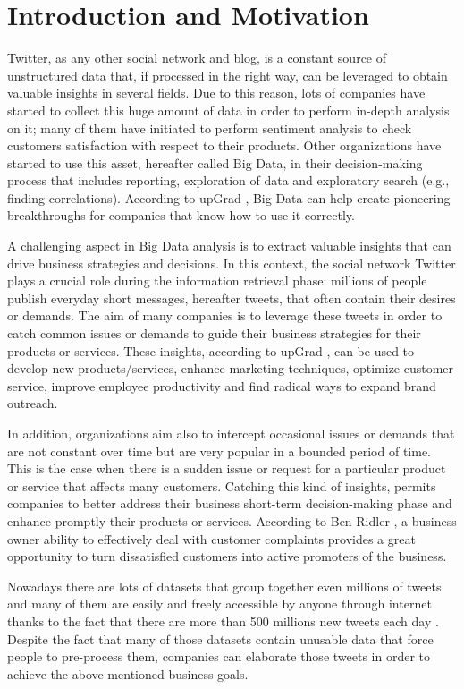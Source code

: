 \section{Introduction and Motivation}
\label{sec:introduction}
Twitter, as any other social network and blog, is a constant source of unstructured data that, if processed in the right way, can be leveraged to obtain valuable insights in several fields. Due to this reason, lots of companies have started to collect this huge amount of data in order to perform in-depth analysis on it; many of them have initiated to perform sentiment analysis to check customers satisfaction with respect to their products. Other organizations have started to use this asset, hereafter called Big Data, in their decision-making process that includes reporting, exploration of data and exploratory search (e.g., finding correlations). According to upGrad \cite{upGrad}, Big Data can help create pioneering breakthroughs for companies that know how to use it correctly.

A challenging aspect in Big Data analysis is to extract valuable insights that can drive business strategies and decisions. In this context, the social network Twitter plays a crucial role during the information retrieval phase: millions of people publish everyday short messages, hereafter tweets, that often contain their desires or demands. The aim of many companies is to leverage these tweets in order to catch common issues or demands to guide their business strategies for their products or services. These insights, according to upGrad \cite{upGrad}, can be used to develop new products/services, enhance marketing techniques, optimize customer service, improve employee productivity and find radical ways to expand brand outreach.

In addition, organizations aim also to intercept occasional issues or demands that are not constant over time but are very popular in a bounded period of time. This is the case when there is a sudden issue or request for a particular product or service that affects many customers. Catching this kind of insights, permits companies to better address their business short-term decision-making phase and enhance promptly their products or services. According to Ben Ridler \cite{customer-satistaction}, a business owner ability to effectively deal with customer complaints provides a great opportunity to turn dissatisfied customers into active promoters of the business.

Nowadays there are lots of datasets that group together even millions of tweets and many of them are easily and freely accessible by anyone through internet thanks to the fact that there are more than 500 millions new tweets each day \cite{twitter-stats}. Despite the fact that many of those datasets contain unusable data that force people to pre-process them, companies can elaborate those tweets in order to achieve the above mentioned business goals.

